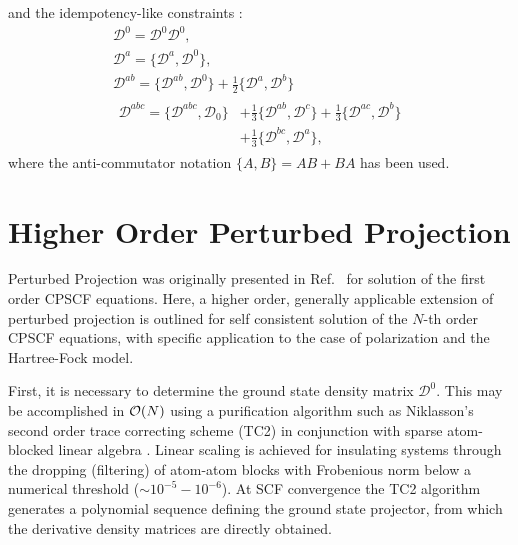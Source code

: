 \documentclass[prl,aps,letterpaper,twocolumn,showpacs,twocolumngrid,superbib]{revtex4}
\def\F{\mathcal{F}}
\def\D{\mathcal{D}}
\begin{document}
and the idempotency-like constraints \cite{Furche_2001}:
\begin{gather}
  \D^{0} =\D^{0} \D^{0},\label{eq:anticommutators1}\\
  \D^{a} =\{\D^{a},\D^{0}\},\label{eq:anticommutators2}\\
  \D^{ab}=\{\D^{ab},\D^{0}\}+\frac{1}{2}\{\D^{a},\D^{b}\}\label{eq:anticommutators3}\\
  \begin{split}
    \D^{abc}=\{\D^{abc},\D_0\}&+\frac{1}{3}\{\D^{ab},\D^{c}\}+\frac{1}{3}\{\D^{ac},\D^{b}\}\\
    &+\frac{1}{3}\{\D^{bc},\D^{a}\}\label{eq:anticommutators4},
  \end{split}
\end{gather}
where the anti-commutator notation $\{A,B\} = AB+BA$ has been used.

\newpage

\section{Higher Order Perturbed Projection}

Perturbed Projection was originally presented in Ref.~
for solution of the first order CPSCF equations.  Here, a higher order, generally applicable 
extension of perturbed projection is outlined for self consistent solution 
of the $N$-th order CPSCF equations, with specific application to the case of polarization and the
Hartree-Fock  model.  

First, it is necessary to determine the ground state density matrix $\mathcal{D}^0$.  This may 
be accomplished in ${\cal O}(N)$ using a purification algorithm such as Niklasson's \cite{ANiklasson02A} 
second order trace correcting scheme (TC2) in conjunction with sparse atom-blocked linear algebra 
\cite{ANiklasson03,MChallacombe00B}.  Linear scaling is achieved for insulating systems through 
the dropping (filtering) of atom-atom blocks with Frobenious norm below a numerical threshold 
($\sim 10^{-5}-10^{-6}$).  At SCF convergence the TC2 algorithm generates a polynomial sequence 
defining the ground state projector, from which the derivative density matrices are directly obtained.
\end{document}
